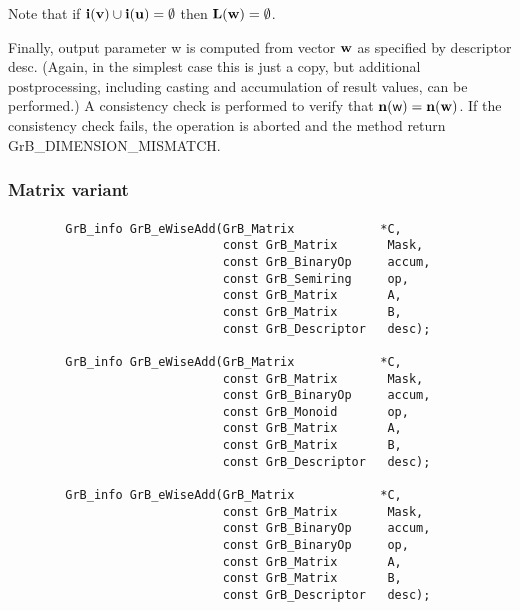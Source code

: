 Note that if ${\bf i}({\bf v}) \cup {\bf i}({\bf u}) = \emptyset$
then $\bold{L}({\bf w}) = \emptyset$.


Finally, output parameter {\sf w} is computed from vector ${\bf w}$
as specified by descriptor {\sf desc}. (Again, in the simplest case this
is just a copy, but additional postprocessing, including casting and
accumulation of result values, can be performed.)  A consistency check is
performed to verify that $\bold{n}({\sf w}) = \bold{n}({\bf w})$. If
the consistency check fails, the operation is aborted and the method
return {\sf GrB\_DIMENSION\_MISMATCH}.


\subsubsection{Matrix variant}


\paragraph{\syntax}

\begin{verbatim}
        GrB_info GrB_eWiseAdd(GrB_Matrix            *C,
                              const GrB_Matrix       Mask,
                              const GrB_BinaryOp     accum,
                              const GrB_Semiring     op, 
                              const GrB_Matrix       A,
                              const GrB_Matrix       B,
                              const GrB_Descriptor   desc);
                            
        GrB_info GrB_eWiseAdd(GrB_Matrix            *C,
                              const GrB_Matrix       Mask,
                              const GrB_BinaryOp     accum,
                              const GrB_Monoid       op, 
                              const GrB_Matrix       A,
                              const GrB_Matrix       B,
                              const GrB_Descriptor   desc);
                            
        GrB_info GrB_eWiseAdd(GrB_Matrix            *C,
                              const GrB_Matrix       Mask,
                              const GrB_BinaryOp     accum,
                              const GrB_BinaryOp     op, 
                              const GrB_Matrix       A,
                              const GrB_Matrix       B,
                              const GrB_Descriptor   desc);
\end{verbatim}

